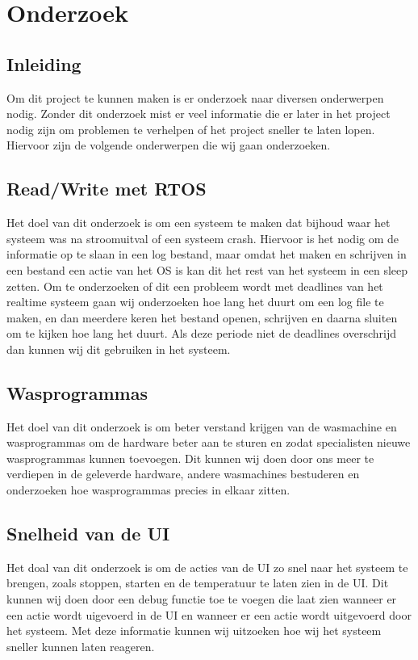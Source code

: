 \chapter{Onderzoek}
\section{Inleiding}
Om dit project te kunnen maken is er onderzoek naar diversen onderwerpen nodig. Zonder dit onderzoek mist er veel informatie die er later in het project nodig zijn om problemen te verhelpen of het project sneller te laten lopen.
Hiervoor zijn de volgende onderwerpen die wij gaan onderzoeken.

\section{Read/Write met RTOS}
Het doel van dit onderzoek is om een systeem te maken dat bijhoud waar het systeem was na stroomuitval of een systeem crash. Hiervoor is het nodig om de informatie op te slaan in een log bestand, maar omdat het maken en schrijven in een 
bestand een actie van het OS is kan dit het rest van het systeem in een sleep zetten. 
Om te onderzoeken of dit een probleem wordt met deadlines van het realtime systeem gaan wij onderzoeken hoe lang het duurt om een log file te maken, en dan meerdere keren het bestand openen, schrijven en daarna sluiten om te kijken hoe lang het duurt. Als deze periode niet de 
deadlines overschrijd dan kunnen wij dit gebruiken in het systeem.

\section{Wasprogrammas}
Het doel van dit onderzoek is om beter verstand krijgen van de wasmachine en wasprogrammas om de hardware beter aan te sturen en zodat specialisten nieuwe wasprogrammas kunnen toevoegen.
Dit kunnen wij doen door ons meer te verdiepen in de geleverde hardware, andere wasmachines bestuderen en onderzoeken hoe wasprogrammas precies in elkaar zitten.

\section{Snelheid van de UI}
Het doal van dit onderzoek is om de acties van de UI zo snel naar het systeem te brengen, zoals stoppen, starten en de temperatuur te laten zien in de UI.
Dit kunnen wij doen door een debug functie toe te voegen die laat zien wanneer er een actie wordt uigevoerd in de UI en wanneer er een actie wordt uitgevoerd door het systeem. Met deze informatie kunnen wij uitzoeken hoe wij het systeem sneller kunnen laten reageren.